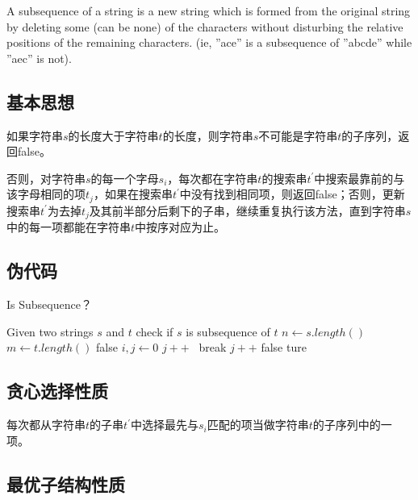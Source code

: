 \documentclass[UTF8,a4paper,12pt]{article}
\begin{document}
\begin{CJK}{UTF8}{gkai}
		A subsequence of a string is a new string which is formed from the original string by deleting some (can be none) of the characters without disturbing the relative positions of the remaining characters. (ie, ”ace” is a subsequence of ”abcde” while ”aec” is not).

	\subsection{基本思想}
		如果字符串$ s $的长度大于字符串$ t $的长度，则字符串$ s $不可能是字符串$ t $的子序列，返回false。
	
		否则，对字符串$ s $的每一个字母$ s_{i} $，每次都在字符串$ t $的搜索串$ t^{'} $中搜索最靠前的与该字母相同的项$ t_{j} $，如果在搜索串$ t^{'} $中没有找到相同项，则返回false；否则，更新搜索串$ t^{'} $为去掉$ t_{j} $及其前半部分后剩下的子串，继续重复执行该方法，直到字符串$ s $中的每一项都能在字符串$ t $中按序对应为止。
				
	\subsection{伪代码}
		\begin{algorithm}[htb]
			\caption{Is Subsequence？}
			\begin{algorithmic}[1]
				\Require
				Given two strings $ s $ and $ t $
				\Ensure
				check if $ s $ is subsequence of $ t $
					\State $ n \gets s.length() $
					\State $ m \gets t.length() $
						\State \Return false
					\EndIf
					\State $ i,j \gets 0 $
							\State $ j++ $\
						\EndWhile
							\State break
						\EndIf
						\State $ j++ $
					\EndFor
						\State \Return false
					\EndIf
					\State \Return ture
				\EndFunction
			\end{algorithmic}
		\end{algorithm}
	
	\subsection{贪心选择性质}
		每次都从字符串$ t $的子串$ t^{'} $中选择最先与$ s_{i} $匹配的项当做字符串$ t $的子序列中的一项。
	\subsection{最优子结构性质}
			

\end{CJK}
\end{document}
